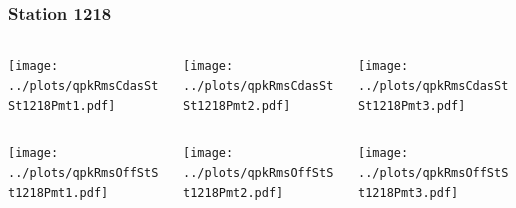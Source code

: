 \documentclass[aspectratio=169]{beamer}
\begin{document}
\begin{frame} 
  \frametitle{Station 1218}
  \begin{center}
    \begin{columns}
      \begin{column}{0.33\textwidth}
        \texttt{[image: ../plots/qpkRmsCdasStSt1218Pmt1.pdf]}
      \end{column}
      \begin{column}{0.33\textwidth}
        \texttt{[image: ../plots/qpkRmsCdasStSt1218Pmt2.pdf]}
      \end{column}
      \begin{column}{0.33\textwidth}
        \texttt{[image: ../plots/qpkRmsCdasStSt1218Pmt3.pdf]}
      \end{column}
    \end{columns}
  \end{center}

  \begin{center}
    \begin{columns}
      \begin{column}{0.33\textwidth}
        \texttt{[image: ../plots/qpkRmsOffStSt1218Pmt1.pdf]}
      \end{column}
      \begin{column}{0.33\textwidth}
        \texttt{[image: ../plots/qpkRmsOffStSt1218Pmt2.pdf]}
      \end{column}
      \begin{column}{0.33\textwidth}
        \texttt{[image: ../plots/qpkRmsOffStSt1218Pmt3.pdf]}
      \end{column}
    \end{columns}
  \end{center}
\end{frame}
\end{document}
